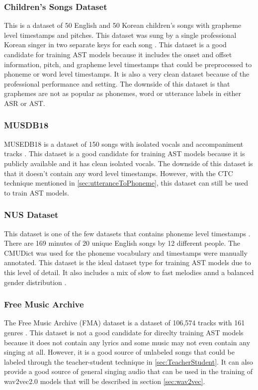 \documentclass[letterpaper, 12pt]{article}
\begin{document}
\begin{multicols*}{2}
\subsubsection{Children's Songs Dataset}
This is a dataset of 50 English and 50 Korean children's songs with grapheme level timestamps and
pitches. This dataset was sung by a single professional Korean singer in two separate keys for each
song \citep{ChildrensSongs}. This dataset is a good candidate for training AST models because it
includes the onset and offset information, pitch, and grapheme level timestamps that could be
preprocessed to phoneme or word level timestamps. It is also a very clean dataset because of the
professional performance and setting. The downside of this dataset is that graphemes are
not as popular as phonemes, word or utterance labels in either ASR or AST.

\subsubsection{MUSDB18}
MUSEDB18 is a dataset of 150 songs with isolated vocals and accompaniment tracks \citep{musdb18}. This
dataset is a good candidate for training AST models because it is publicly available and it has
clean isolated vocals. The downside of this dataset is that it doesn't contain any word level
timestamps. However, with the CTC technique mentioned in \ref{sec:utteranceToPhoneme}, this dataset
can still be used to train AST models.

\subsubsection{NUS Dataset}
This dataset is one of the few datasets that contains phoneme level timestamps \citep{NUSDataset}.
There are 169 minutes of 20 unique English songs by 12 different people. The CMUDict was used
for the phoneme vocabulary and timestamps were manually annotated. This dataset is the ideal dataset
type for training AST models due to this level of detail. It also includes a mix of slow to fast
melodies annd a balanced gender distribution \citep{NUSDataset}.


\subsubsection{Free Music Archive}
The Free Music Archive (FMA) dataset is a dataset of 106,574 tracks with 161 genres \citep{FMA}. This
dataset is not a good candidate for direclty training AST models because it does not contain any lyrics
and some music may not even contain any singing at all. However, it is a good source of unlabeled
songs that could be labeled through the teacher-student technique in \ref{sec:TeacherStudent}. It
can also provide a good source of general singing audio that can be used in the
training of wav2vec2.0 models that will be described in section \ref{sec:wav2vec}.


\end{multicols*}
\end{document}
